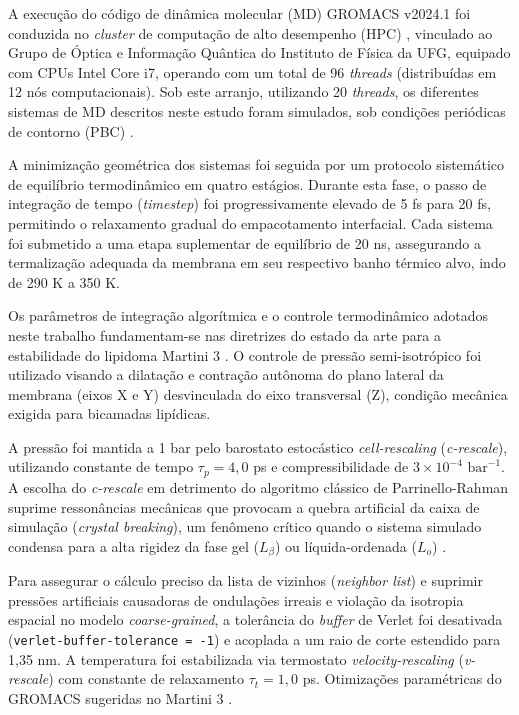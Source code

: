 A execução do código de dinâmica molecular (MD) GROMACS v2024.1 \cite{gromacs2024} foi conduzida no \textit{cluster} de computação de alto desempenho (HPC) \cite{kutzner2023hpc}, vinculado ao Grupo de Óptica e Informação Quântica do Instituto de Física da UFG, equipado com CPUs Intel Core i7, operando com um total de 96 \textit{threads} (distribuídas em 12 nós computacionais). Sob este arranjo, utilizando 20 \textit{threads}, os diferentes sistemas de MD descritos neste estudo foram simulados, sob condições periódicas de contorno (PBC) \cite{gromacs_pbc_2021}.

A minimização geométrica dos sistemas foi seguida por um protocolo sistemático de equilíbrio termodinâmico em quatro estágios. Durante esta fase, o passo de integração de tempo (\textit{timestep}) foi progressivamente elevado de 5 fs para 20 fs, permitindo o relaxamento gradual do empacotamento interfacial. Cada sistema foi submetido a uma etapa suplementar de equilíbrio de 20 ns, assegurando a termalização adequada da membrana em seu respectivo banho térmico alvo, indo de 290 K a 350 K.

Os parâmetros de integração algorítmica e o controle termodinâmico adotados neste trabalho fundamentam-se nas diretrizes do estado da arte para a estabilidade do lipidoma Martini 3 \cite{pedersen2025}. O controle de pressão semi-isotrópico foi utilizado visando a dilatação e contração autônoma do plano lateral da membrana (eixos X e Y) desvinculada do eixo transversal (Z), condição mecânica exigida para bicamadas lipídicas. 

A pressão foi mantida a 1 bar pelo barostato estocástico \textit{cell-rescaling} (\textit{c-rescale}), utilizando constante de tempo $\tau_p = 4,0$ ps e compressibilidade de $3\times10^{-4}\text{ bar}^{-1}$. A escolha do \textit{c-rescale} em detrimento do algoritmo clássico de Parrinello-Rahman suprime ressonâncias mecânicas que provocam a quebra artificial da caixa de simulação (\textit{crystal breaking}), um fenômeno crítico quando o sistema simulado condensa para a alta rigidez da fase gel ($L_\beta$) ou líquida-ordenada ($L_o$) \cite{pedersen2025}.

Para assegurar o cálculo preciso da lista de vizinhos (\textit{neighbor list}) e suprimir pressões artificiais causadoras de ondulações irreais e violação da isotropia espacial no modelo \textit{coarse-grained}, a tolerância do \textit{buffer} de Verlet foi desativada (\texttt{verlet-buffer-tolerance = -1}) e acoplada a um raio de corte estendido para 1,35 nm. A temperatura foi estabilizada via termostato \textit{velocity-rescaling} (\textit{v-rescale}) com constante de relaxamento $\tau_t = 1,0$ ps. Otimizações paramétricas do GROMACS sugeridas no Martini 3 \cite{pedersen2025}.


